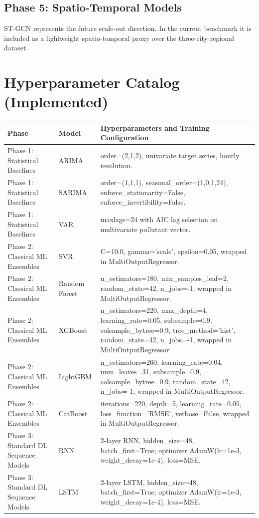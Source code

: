 \documentclass[11pt,a4paper,oneside]{book}
\begin{document}
\section{Phase 5: Spatio-Temporal Models}
ST-GCN represents the future scale-out direction. In the current benchmark it is included as a lightweight spatio-temporal proxy over the three-city regional dataset.


\chapter{Hyperparameter Catalog (Implemented)}
\begin{longtable}{@{}llp{9cm}@{}}
\toprule
Phase & Model & Hyperparameters and Training Configuration \\
\midrule
Phase 1: Statistical Baselines & ARIMA & order=(2,1,2), univariate target series, hourly resolution. \\
Phase 1: Statistical Baselines & SARIMA & order=(1,1,1), seasonal\_order=(1,0,1,24), enforce\_stationarity=False, enforce\_invertibility=False. \\
Phase 1: Statistical Baselines & VAR & maxlags=24 with AIC lag selection on multivariate pollutant vector. \\
Phase 2: Classical ML Ensembles & SVR & C=10.0, gamma='scale', epsilon=0.05, wrapped in MultiOutputRegressor. \\
Phase 2: Classical ML Ensembles & Random Forest & n\_estimators=180, min\_samples\_leaf=2, random\_state=42, n\_jobs=-1, wrapped in MultiOutputRegressor. \\
Phase 2: Classical ML Ensembles & XGBoost & n\_estimators=220, max\_depth=4, learning\_rate=0.05, subsample=0.9, colsample\_bytree=0.9, tree\_method='hist', random\_state=42, n\_jobs=-1, wrapped in MultiOutputRegressor. \\
Phase 2: Classical ML Ensembles & LightGBM & n\_estimators=260, learning\_rate=0.04, num\_leaves=31, subsample=0.9, colsample\_bytree=0.9, random\_state=42, n\_jobs=-1, wrapped in MultiOutputRegressor. \\
Phase 2: Classical ML Ensembles & CatBoost & iterations=220, depth=5, learning\_rate=0.05, loss\_function='RMSE', verbose=False, wrapped in MultiOutputRegressor. \\
Phase 3: Standard DL Sequence Models & RNN & 2-layer RNN, hidden\_size=48, batch\_first=True; optimizer AdamW(lr=1e-3, weight\_decay=1e-4), loss=MSE. \\
Phase 3: Standard DL Sequence Models & LSTM & 2-layer LSTM, hidden\_size=48, batch\_first=True; optimizer AdamW(lr=1e-3, weight\_decay=1e-4), loss=MSE. \\

\end{longtable}
\end{document}
